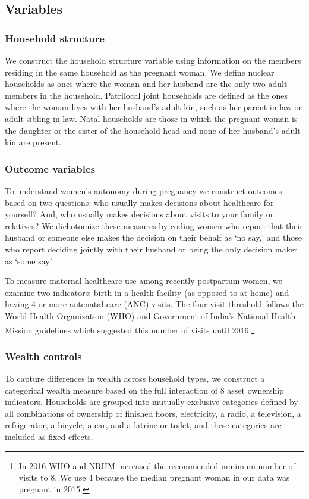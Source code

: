 \documentclass[12pt]{article}
\begin{document}
\subsection{Variables}

\subsubsection{Household structure}
We construct the household structure variable using information on the members residing in the same household as the pregnant woman. We define nuclear households as ones where the woman and her husband are the only two adult members in the household. Patrilocal joint households are defined as the ones where the woman lives with her husband’s adult kin, such as her parent-in-law or adult sibling-in-law. Natal households are those in which the pregnant woman is the daughter or the sister of the household head and none of her husband’s adult kin are present. 

\subsubsection{Outcome variables} \label{sec:outcomes}
To understand women's autonomy during pregnancy we construct outcomes based on two questions: who usually makes decisions about healthcare for yourself?  And, who usually makes decisions about visits to your family or relatives? We dichotomize these measures by coding women who report that their husband or someone else makes the decision on their behalf as ‘no say,’ and those who report deciding jointly with their husband or being the only decision maker as ‘some say’. 

To measure maternal healthcare use among recently postpartum women, we examine two indicators: birth in a health facility (as opposed to at home) and having 4 or more antenatal care (ANC) visits. The four visit threshold follows the World Health Organization (WHO) and Government of India’s National Health Mission guidelines which suggested this number of visits until 2016.\footnote{In 2016 WHO and NRHM increased the recommended minimum number of visits to 8.  We use 4 because the median pregnant woman in our data was pregnant in 2015.}

\subsubsection{Wealth controls} \label{sec:wealthcontrols}

To capture differences in wealth across household types, we construct a categorical wealth measure based on the full interaction of 8 asset ownership indicators. Households are grouped into mutually exclusive categories defined by all combinations of ownership of finished floors, electricity, a radio, a television, a refrigerator, a bicycle, a car, and a latrine or toilet, and these categories are included as fixed effects.
\end{document}
